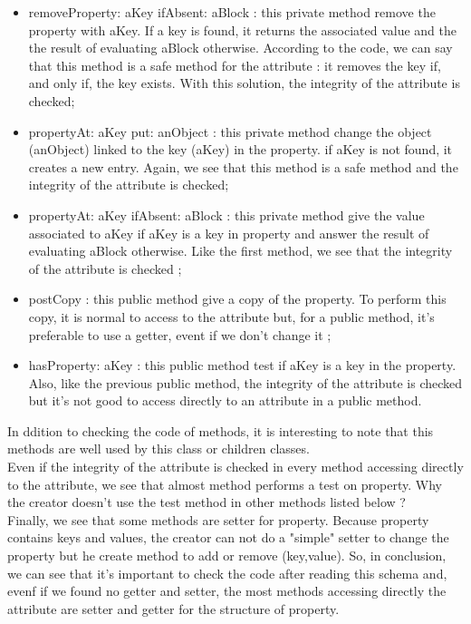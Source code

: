 \begin{itemize}
	\item removeProperty: aKey ifAbsent: aBlock : this private method 	remove the property with aKey.  If a key is found, it returns the associated value and the the result of evaluating aBlock otherwise.  According to the code, we can say that this method is a safe method for the attribute : it removes the key if, and only if, the key exists.  With this solution, the integrity of the attribute is checked;
	\item propertyAt: aKey put: anObject : this private method change the object (anObject) linked to the key (aKey) in the property.  if aKey is not found, it creates a new entry.  Again, we see that this method is a safe method and the integrity of the attribute is checked;
	\item propertyAt: aKey ifAbsent: aBlock : this private method give the value associated to aKey if aKey is a key in property and answer the result of evaluating aBlock otherwise.  Like the first method, we see that the integrity of the attribute is checked ;
	\item postCopy : this public method give a copy of the property.  To perform this copy, it is normal to access to the attribute but, for a public method, it's preferable to use a getter, event if we don't change it ;
	\item hasProperty: aKey : this public method test if aKey is a key in the property.  Also, like the previous public method, the integrity of the attribute is checked but it's not good to access directly to an attribute in a public method.
\end{itemize}
In ddition to checking the code of methods, it is interesting to note that this methods are well used by this class or children classes.\\
Even if the integrity of the attribute is checked in every method accessing directly to the attribute, we see that almost method performs a test on property.  Why the creator doesn't use the test method in other methods listed below ? \\
Finally, we see that some methods are setter for property.  Because property contains keys and values, the creator can not do a "simple" setter to change the property but he create method to add or remove (key,value).  So, in conclusion, we can see that it's important to check the code after reading this schema and, evenf if we found no getter and setter, the most methods accessing directly the attribute are setter and getter for the structure of property.\\

